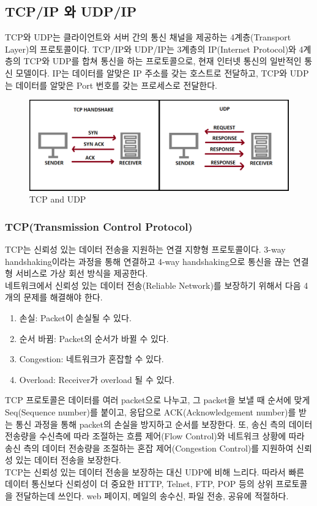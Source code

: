 \subsection{TCP/IP 와 UDP/IP}    
    TCP와 UDP는 클라이언트와 서버 간의 통신 채널을 제공하는 4계층(Transport Layer)의 프로토콜이다. TCP/IP와 UDP/IP는 3계층의 IP(Internet Protocol)와 4계층의 TCP와 UDP를 합쳐 통신을 하는 프로토콜으로, 현재 인터넷 통신의 일반적인 통신 모델이다. IP는 데이터를 알맞은 IP 주소를 갖는 호스트로 전달하고, TCP와 UDP는 데이터를 알맞은 Port 번호를 갖는 프로세스로 전달한다. \\
    \vspace{-4mm}
    \begin{figure}[!h]\centering
		\includegraphics[width=.65\textwidth]{image/week07/1-2.png}
		\caption{\small TCP and UDP}
		\vspace{-10pt}
    \end{figure}
    
    \subsubsection*{TCP(Transmission Control Protocol)}
    TCP는 신뢰성 있는 데이터 전송을 지원하는 연결 지향형 프로토콜이다. 3-way handshaking이라는 과정을 통해 연결하고 4-way handshaking으로 통신을 끊는 연결형 서비스로 가상 회선 방식을 제공한다. \\
    네트워크에서 신뢰성 있는 데이터 전송(Reliable Network)를 보장하기 위해서 다음 4개의 문제를 해결해야 한다. \\
    \begin{enumerate}
        \item 손실: Packet이 손실될 수 있다.
        \item 순서 바뀜: Packet의 순서가 바뀔 수 있다.
        \item Congestion: 네트워크가 혼잡할 수 있다.
        \item Overload: Receiver가 overload 될 수 있다.
    \end{enumerate}
    TCP 프로토콜은 데이터를 여러 packet으로 나누고, 그 packet을 보낼 때 순서에 맞게 Seq(Sequence number)를 붙이고, 응답으로 ACK(Acknowledgement number)를 받는 통신 과정을 통해 packet의 손실을 방지하고 순서를 보장한다. 또, 송신 측의 데이터 전송량을 수신측에 따라 조절하는 흐름 제어(Flow Control)와 네트워크 상황에 따라 송신 측의 데이터 전송량을 조절하는 혼잡 제어(Congestion Control)를 지원하여 신뢰성 있는 데이터 전송을 보장한다. \\
    TCP는 신뢰성 있는 데이터 전송을 보장하는 대신 UDP에 비해 느리다. 따라서 빠른 데이터 통신보다 신뢰성이 더 중요한 HTTP, Telnet, FTP, POP 등의 상위 프로토콜을 전달하는데 쓰인다. web 페이지, 메일의 송수신, 파일 전송, 공유에 적절하다. \\
    
